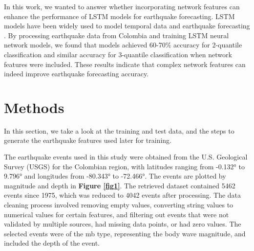 \documentclass[sn-mathphys-num]{sn-jnl}
\begin{document}
In this work, we wanted to answer whether incorporating network features can enhance the performance of LSTM models for earthquake forecasting. LSTM models have been widely used to model temporal data and earthquake forecasting \cite{lai_modeling_2018, cai_anomaly_2019,banna_attention-based_2021,wang_earthquake_2020, nazaria_predicting_2021}. By processing earthquake data from Colombia and training LSTM neural network models, we found that models achieved 60-70\% accuracy for 2-quantile classification and similar accuracy for 3-quantile classification when network features were included. These results indicate that complex network features can indeed improve earthquake forecasting accuracy.

\section{Methods}\label{methods}

In this section, we take a look at the training and test data, and the steps to generate the earthquake features used later for training.

The earthquake events used in this study were obtained from the U.S. Geological Survey (USGS) for the Colombian region, with latitudes ranging from -0.132° to 9.796° and longitudes from -80.343° to -72.466°. The events are plotted by magnitude and depth in \textbf{Figure \ref{fig1}}. The retrieved dataset contained 5462 events since 1975, which was reduced to 4042 events after processing. The data cleaning process involved removing empty values, converting string values to numerical values for certain features, and filtering out events that were not validated by multiple sources, had missing data points, or had zero values. The selected events were of the mb type, representing the body wave magnitude, and included the depth of the event.
\end{document}
